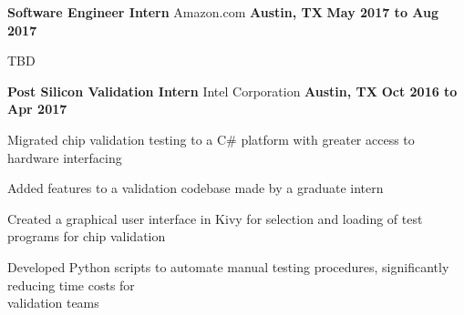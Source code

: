 \begin{cventries}
  \cventry
    {\normalsize \textbf{Software Engineer Intern}}
    {\large Amazon.com}
    {\normalsize \textbf{Austin, TX}}
    {\normalsize \textbf{May 2017 to Aug 2017}}
    {
      \begin{cvitems}
        \item {\normalsize TBD}
      \end{cvitems}
    }
  \cventry
    {\normalsize \textbf{Post Silicon Validation Intern}}
    {\large Intel Corporation}
    {\normalsize \textbf{Austin, TX}}
    {\normalsize \textbf{Oct 2016 to Apr 2017}}
    {
      \begin{cvitems}
        \item {\normalsize Migrated chip validation testing to a C# platform with greater access to hardware interfacing} 
        \item {\normalsize Added features to a validation codebase made by a graduate intern}
        \item {\normalsize Created a graphical user interface in Kivy for selection and loading of test programs for chip validation}
        \item {\normalsize Developed Python scripts to automate manual testing procedures, significantly reducing time costs for \\validation teams}
      \end{cvitems}
    }
\end{cventries}
